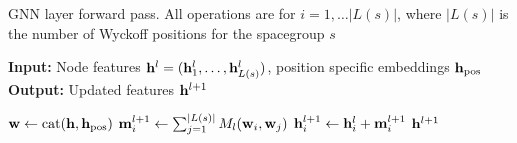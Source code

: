 \begin{algorithm}[tb]
   \caption{GNN layer forward pass. All operations are for $i = 1, \dots |L(s)|$, where $|L(s)|$ is the number of Wyckoff positions for the spacegroup $s$}
   \label{algo:gnn_layer_forward}
   \hspace*{\algorithmicindent} \textbf{Input:} Node features ${\mathbf{h}}^l = ({\mathbf{h}}_1^l, \dots, {\mathbf{h}}_{L(s)}^l)$, position specific embeddings ${\mathbf{h}}_\text{pos}$ \\
   \hspace*{\algorithmicindent} \textbf{Output:} Updated features ${\mathbf{h}}^{l+1}$
\begin{algorithmic}
\STATE $\mathbf{w} \gets \text{cat}({\mathbf{h}}, {\mathbf{h}}_\text{pos})$
\STATE $\mathbf{m}_i^{l+1} \gets \sum_{j=1}^{|L(s)|} M_l({\mathbf{w}}_i, {\mathbf{w}}_j)$ 
\STATE ${\mathbf{h}}_i^{l+1} \gets {\mathbf{h}}_i^{l} +\mathbf{m}_i^{l+1}$  
\RETURN ${\mathbf{h}}^{l+1}$
\end{algorithmic}
\end{algorithm}
